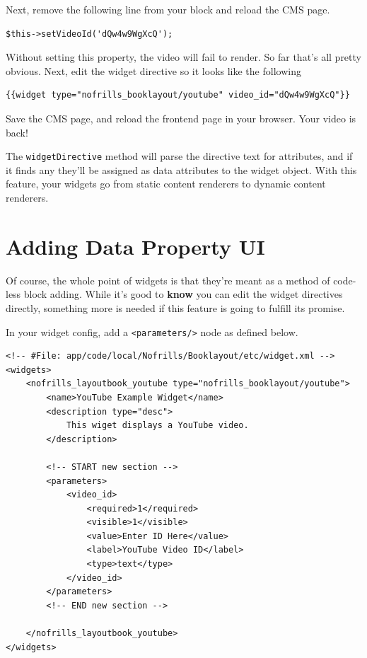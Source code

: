 \documentclass[oneside]{book}
\begin{document}
Next, remove the following line from your block and reload the CMS page.

\begin{lstlisting}
$this->setVideoId('dQw4w9WgXcQ');   

\end{lstlisting}


Without setting this property, the video will fail to render.  So far that's all pretty obvious.  Next, edit the widget directive so it looks like the following

\begin{lstlisting}
{{widget type="nofrills_booklayout/youtube" video_id="dQw4w9WgXcQ"}}

\end{lstlisting}


Save the CMS page, and reload the frontend page in your browser.  Your video is back!

The \footnotesize\texttt{widgetDirective} \normalsize  method will parse the directive text for attributes, and if it finds any they'll be assigned as data attributes to the widget object.  With this feature, your widgets go from static content renderers to dynamic content renderers.

\section{Adding Data Property UI}

Of course, the whole point of widgets is that they're meant as a method of code-less block adding.  While it's good to \textbf{know} you can edit the widget directives directly, something more is needed if this feature is going to fulfill its promise.

In your widget config, add a \footnotesize\texttt{\textless parameters/\textgreater } \normalsize  node as defined below.

\begin{lstlisting}
<!-- #File: app/code/local/Nofrills/Booklayout/etc/widget.xml -->
<widgets>
    <nofrills_layoutbook_youtube type="nofrills_booklayout/youtube">
        <name>YouTube Example Widget</name>
        <description type="desc">
            This wiget displays a YouTube video.
        </description>

        <!-- START new section -->
        <parameters>
            <video_id>
                <required>1</required>
                <visible>1</visible>
                <value>Enter ID Here</value>
                <label>YouTube Video ID</label>
                <type>text</type>
            </video_id>
        </parameters>   
        <!-- END new section -->

    </nofrills_layoutbook_youtube>
</widgets>  

\end{lstlisting}
\end{document}
